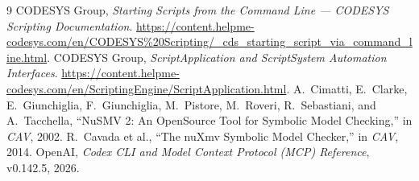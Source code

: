 \begin{thebibliography}{9}
 CODESYS Group, \emph{Starting Scripts from the Command Line --- CODESYS Scripting Documentation}. \url{https://content.helpme-codesys.com/en/CODESYS%20Scripting/_cds_starting_script_via_command_line.html}.
 CODESYS Group, \emph{ScriptApplication and ScriptSystem Automation Interfaces}. \url{https://content.helpme-codesys.com/en/ScriptingEngine/ScriptApplication.html}.
 A.~Cimatti, E.~Clarke, E.~Giunchiglia, F.~Giunchiglia, M.~Pistore, M.~Roveri, R.~Sebastiani, and A.~Tacchella, ``NuSMV 2: An OpenSource Tool for Symbolic Model Checking,'' in \emph{CAV}, 2002.
 R.~Cavada et al., ``The nuXmv Symbolic Model Checker,'' in \emph{CAV}, 2014.
 OpenAI, \emph{Codex CLI and Model Context Protocol (MCP) Reference}, v0.142.5, 2026.
\end{thebibliography}